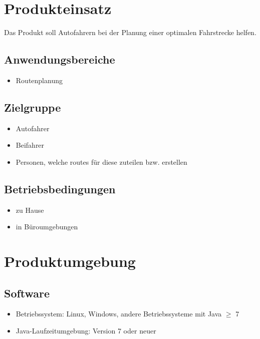 \documentclass[a4paper, 11pt]{article}
\begin{document}
\section{Produkteinsatz}

Das Produkt soll Autofahrern bei der Planung einer optimalen Fahrstrecke helfen.

\subsection{Anwendungsbereiche}
\begin{itemize}
\item Routenplanung
\end{itemize}

\subsection{Zielgruppe}
\begin{itemize}
\item Autofahrer
\item Beifahrer
\item Personen, welche \glspl{route} für diese zuteilen bzw. erstellen
\end{itemize}

\subsection{Betriebsbedingungen}
\begin{itemize}
\item zu Hause
\item in Büroumgebungen
\end{itemize}

\section{Produktumgebung}

\subsection{Software}\label{subsec:Software}

\begin{itemize}
\item Betriebssystem: Linux, Windows, andere Betriebssysteme mit Java $\geq$ 7
\item Java-Laufzeitumgebung: Version 7 oder neuer
\end{itemize}
\end{document}
